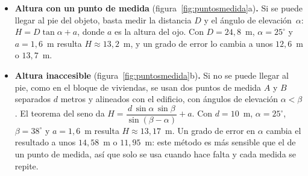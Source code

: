 \begin{itemize}
  \item \textbf{Altura con un punto de medida} (figura~\ref{fig:puntosmedida}a)\textbf{.} Si se puede llegar al pie del objeto, basta medir la distancia $D$ y el ángulo de elevación~$\alpha$: $H = D\tan\alpha + a$, donde $a$ es la altura del ojo. Con $D=24{,}8$~m, $\alpha=25^\circ$ y $a=1{,}6$~m resulta $H\approx 13{,}2$~m, y un grado de error lo cambia a unos $12{,}6$~m o $13{,}7$~m.
  \item \textbf{Altura inaccesible} (figura~\ref{fig:puntosmedida}b)\textbf{.} Si no se puede llegar al pie, como en el bloque de viviendas, se usan dos puntos de medida $A$ y $B$ separados $d$ metros y alineados con el edificio, con ángulos de elevación $\alpha<\beta$. El teorema del seno da
  $H = \dfrac{d\,\sin\alpha\,\sin\beta}{\sin(\beta-\alpha)} + a$. Con $d=10$~m, $\alpha=25^\circ$, $\beta=38^\circ$ y $a=1{,}6$~m resulta $H\approx 13{,}17$~m. Un grado de error en $\alpha$ cambia el resultado a unos $14{,}58$~m o $11{,}95$~m: este método es más sensible que el de un punto de medida, así que solo se usa cuando hace falta y cada medida se repite.
\end{itemize}

